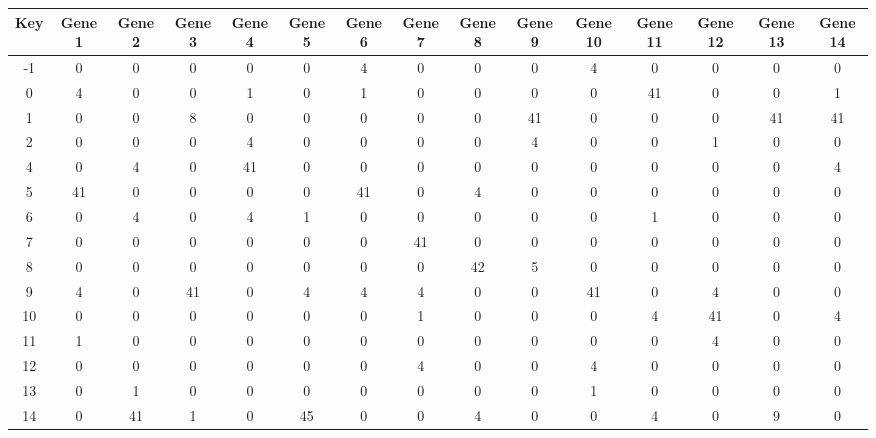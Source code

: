 \begin{tabular}{|c|c|c|c|c|c|c|c|c|c|c|c|c|c|c|}
\hline
Key & Gene 1 & Gene 2 & Gene 3 & Gene 4 & Gene 5 & Gene 6 & Gene 7 & Gene 8 & Gene 9 & Gene 10 & Gene 11 & Gene 12 & Gene 13 & Gene 14 \\
\hline
-1 & 0 & 0 & 0 & 0 & 0 & 4 & 0 & 0 & 0 & 4 & 0 & 0 & 0 & 0 \\
0 & 4 & 0 & 0 & 1 & 0 & 1 & 0 & 0 & 0 & 0 & 41 & 0 & 0 & 1 \\
1 & 0 & 0 & 8 & 0 & 0 & 0 & 0 & 0 & 41 & 0 & 0 & 0 & 41 & 41 \\
2 & 0 & 0 & 0 & 4 & 0 & 0 & 0 & 0 & 4 & 0 & 0 & 1 & 0 & 0 \\
4 & 0 & 4 & 0 & 41 & 0 & 0 & 0 & 0 & 0 & 0 & 0 & 0 & 0 & 4 \\
5 & 41 & 0 & 0 & 0 & 0 & 41 & 0 & 4 & 0 & 0 & 0 & 0 & 0 & 0 \\
6 & 0 & 4 & 0 & 4 & 1 & 0 & 0 & 0 & 0 & 0 & 1 & 0 & 0 & 0 \\
7 & 0 & 0 & 0 & 0 & 0 & 0 & 41 & 0 & 0 & 0 & 0 & 0 & 0 & 0 \\
8 & 0 & 0 & 0 & 0 & 0 & 0 & 0 & 42 & 5 & 0 & 0 & 0 & 0 & 0 \\
9 & 4 & 0 & 41 & 0 & 4 & 4 & 4 & 0 & 0 & 41 & 0 & 4 & 0 & 0 \\
10 & 0 & 0 & 0 & 0 & 0 & 0 & 1 & 0 & 0 & 0 & 4 & 41 & 0 & 4 \\
11 & 1 & 0 & 0 & 0 & 0 & 0 & 0 & 0 & 0 & 0 & 0 & 4 & 0 & 0 \\
12 & 0 & 0 & 0 & 0 & 0 & 0 & 4 & 0 & 0 & 4 & 0 & 0 & 0 & 0 \\
13 & 0 & 1 & 0 & 0 & 0 & 0 & 0 & 0 & 0 & 1 & 0 & 0 & 0 & 0 \\
14 & 0 & 41 & 1 & 0 & 45 & 0 & 0 & 4 & 0 & 0 & 4 & 0 & 9 & 0 \\
\hline
\end{tabular}